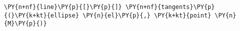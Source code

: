 \begin{Verbatim}[commandchars=\\\{\}]
    \PY{n+nf}{line}\PY{p}{[}\PY{p}{]} \PY{n+nf}{tangents}\PY{p}{(}\PY{k+kt}{ellipse} \PY{n}{el}\PY{p}{,} \PY{k+kt}{point} \PY{n}{M}\PY{p}{)}
\end{Verbatim}
